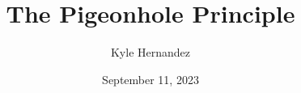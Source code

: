 \documentclass{article}
\title{The Pigeonhole Principle}
\author{Kyle Hernandez}
\date{September 11, 2023}
\begin{document}
\maketitle
\
\end{document}
